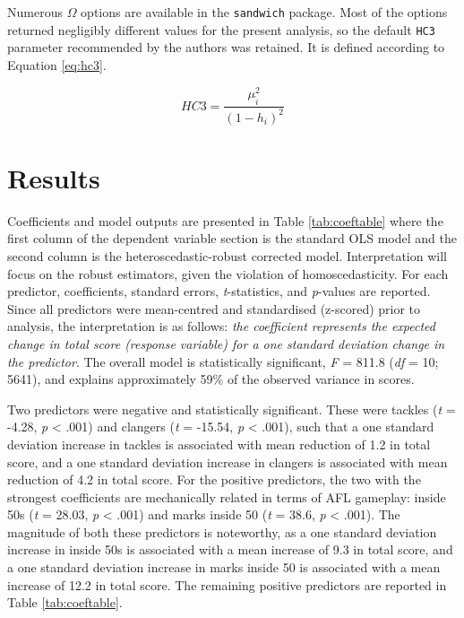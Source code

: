 \documentclass{article}
\begin{document}
Numerous \(\Omega\) options are available in the \texttt{sandwich} package. Most of the options returned negligibly different values for the present analysis, so the default \texttt{HC3} parameter recommended by the authors was retained. It is defined according to Equation \eqref{eq:hc3}.

\begin{equation}
HC3 = \frac{\mu^{2}_{\hat{i}}}{(1-h_{i})^{2}} \label{eq:hc3}
\end{equation}

\hypertarget{results}{%
\section{Results}\label{results}}

Coefficients and model outputs are presented in Table \ref{tab:coeftable} where the first column of the dependent variable section is the standard OLS model and the second column is the heteroscedastic-robust corrected model. Interpretation will focus on the robust estimators, given the violation of homoscedasticity. For each predictor, coefficients, standard errors, \emph{t}-statistics, and \emph{p}-values are reported. Since all predictors were mean-centred and standardised (z-scored) prior to analysis, the interpretation is as follows: \emph{the coefficient represents the expected change in total score (response variable) for a one standard deviation change in the predictor}. The overall model is statistically significant, \emph{F} = 811.8 (\emph{df} = 10; 5641), and explains approximately 59\% of the observed variance in scores.

Two predictors were negative and statistically significant. These were tackles (\emph{t} = -4.28, \emph{p} \textless{} .001) and clangers (\emph{t} = -15.54, \emph{p} \textless{} .001), such that a one standard deviation increase in tackles is associated with mean reduction of 1.2 in total score, and a one standard deviation increase in clangers is associated with mean reduction of 4.2 in total score. For the positive predictors, the two with the strongest coefficients are mechanically related in terms of AFL gameplay: inside 50s (\emph{t} = 28.03, \emph{p} \textless{} .001) and marks inside 50 (\emph{t} = 38.6, \emph{p} \textless{} .001). The magnitude of both these predictors is noteworthy, as a one standard deviation increase in inside 50s is associated with a mean increase of 9.3 in total score, and a one standard deviation increase in marks inside 50 is associated with a mean increase of 12.2 in total score. The remaining positive predictors are reported in Table \ref{tab:coeftable}.
\end{document}
